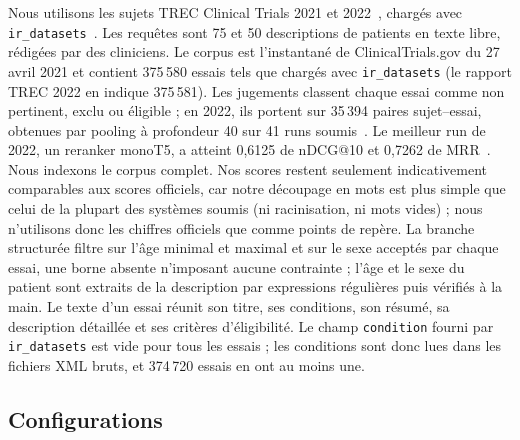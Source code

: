 \documentclass{article}
\begin{document}
Nous utilisons les sujets TREC Clinical Trials 2021 et 2022~\citep{roberts2021trecct}, chargés avec \texttt{ir\_datasets}~\citep{irdatasets}. Les requêtes sont 75 et 50 descriptions de patients en texte libre, rédigées par des cliniciens. Le corpus est l'instantané de ClinicalTrials.gov du 27 avril 2021 et contient 375\,580 essais tels que chargés avec \texttt{ir\_datasets} (le rapport TREC 2022 en indique 375\,581). Les jugements classent chaque essai comme non pertinent, exclu ou éligible ; en 2022, ils portent sur 35\,394 paires sujet--essai, obtenues par pooling à profondeur 40 sur 41 runs soumis~\citep{roberts2022trecct}. Le meilleur run de 2022, un reranker monoT5, a atteint 0,6125 de nDCG@10 et 0,7262 de MRR~\citep{roberts2022trecct}. Nous indexons le corpus complet. Nos scores restent seulement indicativement comparables aux scores officiels, car notre découpage en mots est plus simple que celui de la plupart des systèmes soumis (ni racinisation, ni mots vides) ; nous n'utilisons donc les chiffres officiels que comme points de repère. La branche structurée filtre sur l'âge minimal et maximal et sur le sexe acceptés par chaque essai, une borne absente n'imposant aucune contrainte ; l'âge et le sexe du patient sont extraits de la description par expressions régulières puis vérifiés à la main. Le texte d'un essai réunit son titre, ses conditions, son résumé, sa description détaillée et ses critères d'éligibilité. Le champ \texttt{condition} fourni par \texttt{ir\_datasets} est vide pour tous les essais ; les conditions sont donc lues dans les fichiers XML bruts, et 374\,720 essais en ont au moins une.



\subsection{Configurations}
\end{document}
